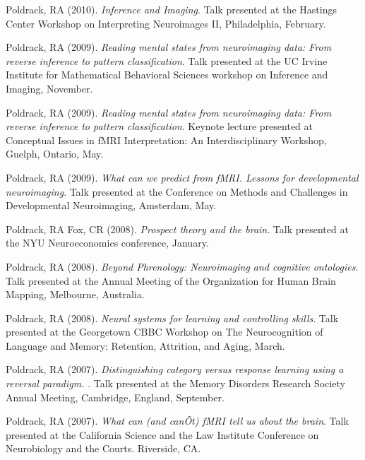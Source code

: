 \documentclass[10pt, letterpaper]{article}
\begin{document}
Poldrack, RA (2010). \emph{Inference and Imaging}. Talk presented at the Hastings Center Workshop on Interpreting Neuroimages II, Philadelphia, February. \vspace{2mm}

Poldrack, RA (2009). \emph{Reading mental states from neuroimaging data: From reverse inference to pattern classification}. Talk presented at the UC Irvine Institute for Mathematical Behavioral Sciences workshop on Inference and Imaging, November. \vspace{2mm}

Poldrack, RA (2009). \emph{Reading mental states from neuroimaging data: From reverse inference to pattern classification}. Keynote lecture presented at Conceptual Issues in fMRI Interpretation: An Interdisciplinary Workshop, Guelph, Ontario, May. \vspace{2mm}

Poldrack, RA (2009). \emph{What can we predict from fMRI. Lessons for developmental neuroimaging}. Talk presented at the Conference on Methods and Challenges in Developmental Neuroimaging, Amsterdam, May. \vspace{2mm}

Poldrack, RA  Fox, CR (2008). \emph{Prospect theory and the brain}. Talk presented at the NYU Neuroeconomics conference, January. \vspace{2mm}

Poldrack, RA (2008). \emph{Beyond Phrenology: Neuroimaging and cognitive ontologies}. Talk presented at the Annual Meeting of the Organization for Human Brain Mapping, Melbourne, Australia. \vspace{2mm}

Poldrack, RA (2008). \emph{Neural systems for learning and controlling skills}. Talk presented at the Georgetown CBBC Workshop on The Neurocognition of Language and Memory: Retention, Attrition, and Aging, March. \vspace{2mm}

Poldrack, RA (2007). \emph{Distinguishing category versus response learning using a reversal paradigm. }. Talk presented at the Memory Disorders Research Society Annual Meeting, Cambridge, England, September. \vspace{2mm}

Poldrack, RA (2007). \emph{What can (and can\~Ot) fMRI tell us about the brain}. Talk presented at the California Science and the Law Institute Conference on Neurobiology and the Courts. Riverside, CA. \vspace{2mm}
\end{document}
